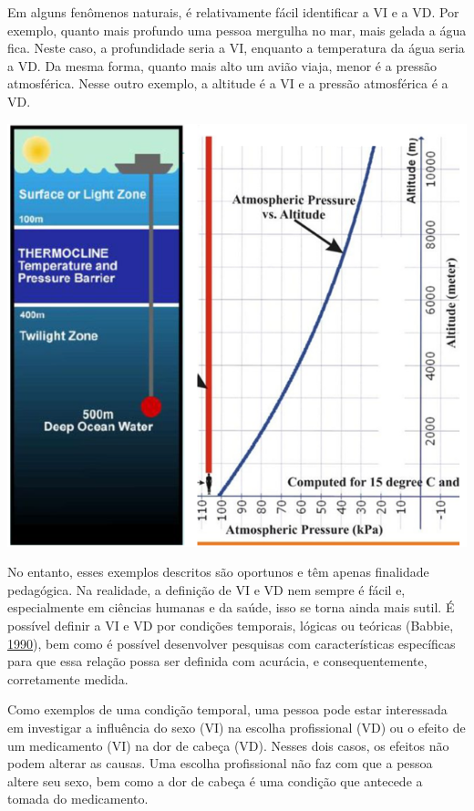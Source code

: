 \documentclass[
]{book}
\begin{document}
Em alguns fenômenos naturais, é relativamente fácil identificar a VI e a
VD. Por exemplo, quanto mais profundo uma pessoa mergulha no mar, mais
gelada a água fica. Neste caso, a profundidade seria a VI, enquanto a
temperatura da água seria a VD. Da mesma forma, quanto mais alto um
avião viaja, menor é a pressão atmosférica. Nesse outro exemplo, a
altitude é a VI e a pressão atmosférica é a VD.

\includegraphics{./img/cap_vivd_fisica.png}

No entanto, esses exemplos descritos são oportunos e têm apenas
finalidade pedagógica. Na realidade, a definição de VI e VD nem sempre é
fácil e, especialmente em ciências humanas e da saúde, isso se torna
ainda mais sutil. É possível definir a VI e VD por condições temporais,
lógicas ou teóricas (Babbie,
\protect\hyperlink{ref-BabbieEarlR1990}{1990}), bem como é possível
desenvolver pesquisas com características específicas para que essa
relação possa ser definida com acurácia, e consequentemente,
corretamente medida.

Como exemplos de uma condição temporal, uma pessoa pode estar
interessada em investigar a influência do sexo (VI) na escolha
profissional (VD) ou o efeito de um medicamento (VI) na dor de cabeça
(VD). Nesses dois casos, os efeitos não podem alterar as causas. Uma
escolha profissional não faz com que a pessoa altere seu sexo, bem como
a dor de cabeça é uma condição que antecede a tomada do medicamento.
\end{document}
